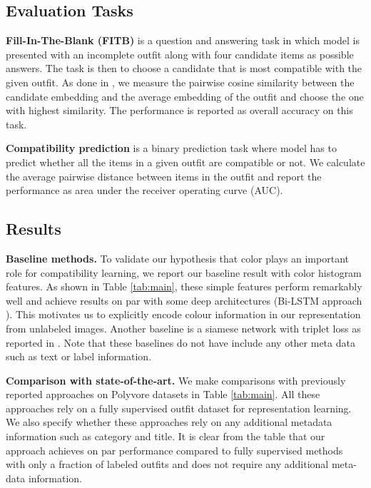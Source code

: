 \documentclass[sigconf]{acmart}
\begin{document}
\subsection{Evaluation Tasks}
\noindent \textbf{Fill-In-The-Blank (FITB)} is a question and answering task in which model is presented with an incomplete outfit along with four candidate items as possible answers. The task is then to choose a candidate that is most compatible with the given outfit. As done in \cite{eccv2018learning}, we measure the pairwise cosine similarity between the candidate embedding and the average embedding of the outfit and choose the one with highest similarity. The performance is reported as overall accuracy on this task.

\vspace{2mm}
\noindent \textbf{Compatibility prediction} is a binary prediction task where model has to predict whether all the items in a given outfit are compatible or not. We calculate the average pairwise distance between items in the outfit and report the performance as area under the receiver operating curve (\textsc{AUC}).

\subsection{Results}
\label{sec:results}
\noindent \textbf{Baseline methods.} To validate our hypothesis that color plays an important role for compatibility learning, we report our baseline result with color histogram features. As shown in Table \ref{tab:main}, these simple features perform remarkably well and achieve results on par with some deep architectures (Bi-LSTM approach \cite{bilstm}). This motivates us to explicitly encode colour information in our representation from unlabeled images. Another baseline is a siamese network with triplet loss as reported in \cite{eccv2018learning}. Note that these baselines do not have include any other meta data such as text or label information.

\vspace{1mm}

\noindent \textbf{Comparison with state-of-the-art.} We make comparisons with previously reported approaches on Polyvore datasets in Table \ref{tab:main}. All these approaches rely on a fully supervised outfit dataset for representation learning. We also specify whether these approaches rely on any additional metadata information such as category and title. It is clear from the table that our approach achieves on par performance compared to fully supervised methods with only a fraction of labeled outfits and does not require any additional meta-data information.
\end{document}
